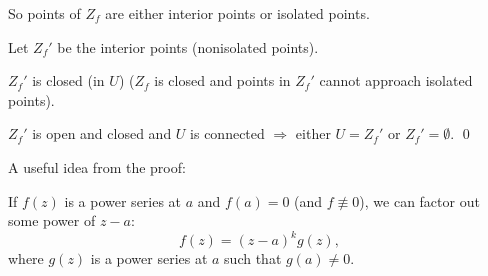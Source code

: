 \documentclass[10pt,aspectratio=169]{beamer}
\begin{document}
\begin{frame}

So points of $Z_f$ are either interior points or isolated points.

\medskip
\pause

Let $Z_f'$ be the interior points (nonisolated points).

\medskip
\pause

$Z_f'$ is closed (in $U$) ($Z_f$ is closed
and points in $Z_f'$ cannot approach isolated points).

\medskip
\pause

$Z_f'$ is open and closed and $U$ is connected $\Rightarrow$ either $U=Z_f'$ or $Z_f' = \emptyset$.
\qed

\end{frame}

\begin{frame}
A useful idea from the proof:

\medskip
\pause

If $f(z)$ is a power series at $a$ and $f(a)=0$ (and $f\not\equiv 0$),
we can factor out some power of $z-a$:
\pause
\begin{equation*}
f(z) = {(z-a)}^k g(z) ,
\end{equation*}
where $g(z)$ is a power series at $a$ such that $g(a) \not= 0$.
\end{frame}
\end{document}
